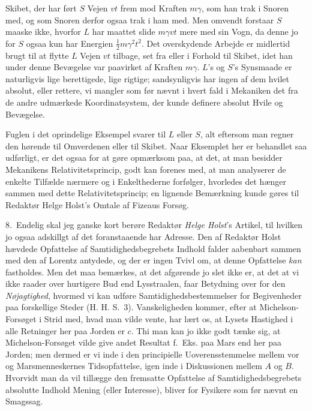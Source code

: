 \documentclass[12pt,a4paper]{article}
\newcommand{\opage}[1]{\marginnote{\footnotesize\textit{[#1]}}}
\begin{document}
Skibet, der har ført $S$ Vejen $vt$ frem mod Kraften $m\gamma$, som han
trak i Snoren med, og som Snoren derfor ogsaa trak i ham med. Men
omvendt forstaar $S$ maaske ikke, hvorfor $L$ har maattet slide
$m\gamma vt$ mere med sin Vogn, da denne jo for $S$ ogsaa kun har
Energien $\tfrac{1}{2}m\gamma^{2}t^{2}$. Det overskydende Arbejde er
midlertid brugt til at flytte $L$ Vejen $vt$ tilbage, set fra eller i
Forhold til Skibet, idet han under denne Bevægelse var paavirket af
Kraften $m\gamma$. $L$'s og $S$'s Synsmaade er naturligvis lige
berettigede, lige rigtige; sandsynligvis har ingen af dem hvilet
absolut, eller rettere, vi mangler som før nævnt i hvert fald i
Mekaniken det fra de andre udmærkede Koordinatsystem, der kunde
definere absolut Hvile og Bevægelse.

Fuglen i det oprindelige Eksempel svarer til $L$ eller $S$, alt
eftersom man regner den hørende til Omverdenen eller til Skibet. Naar
Eksemplet her er behandlet saa udførligt, er det ogsaa for at gøre
opmærksom paa, at det, at man besidder Mekanikens
Relativitetsprincip, godt kan forenes med, at man analyserer de
enkelte Tilfælde nærmere og i Enkelthederne forfølger, hvorledes det
hænger sammen med dette Relativitetsprincip; en lignende Bemærkning
kunde gøres til Redaktør Helge Holst's Omtale af Fizeaus Forsøg.

8.\ Endelig skal jeg ganske kort berøre Redaktør \emph{Helge Holst}'s
Artikel, til hvilken jo ogsaa adskillgt af det foranstaaende har
Adresse. Den af Redaktør Holst hævdede Opfattelse af
Samtidighedsbegrebets Indhold falder aabenbart sammen med den af
Lorentz antydede, og der er ingen Tvivl om, at denne Opfattelse
\emph{kan} fastholdes. Men det maa bemærkes, at det afgørende jo slet
ikke er, at det at vi ikke raader over hurtigere Bud end Lysstraalen,
faar Betydning over for den \emph{Nøjagtighed}, hvormed vi kan udføre
Samtidighedsbestemmelser for Begivenheder paa forskellige Steder (H.
H. S.~3). Vanskeligheden kommer, efter at Michelson-Forsøget i Strid
med, hvad man vilde vente, har lært os, at Lysets Hastighed i alle
Retninger her paa Jorden er $c$. Thi man kan jo ikke godt tænke sig,
at Michelson-Forsøget vilde give andet Resultat f.~Eks. paa Mars end
her paa Jorden; men dermed er vi inde i den principielle
Uoverensstemmelse mellem vor og Marsmenneskernes Tidsopfattelse, igen
inde i Diskussionen mellem $A$ og $B$. Hvorvidt man da vil tillægge den
fremsatte Opfattelse af Samtidighedsbegrebets absolutte
\opage{29} %
Indhold Mening (eller Interesse), bliver for Fysikere som før nævnt en
Smagssag.
\end{document}
